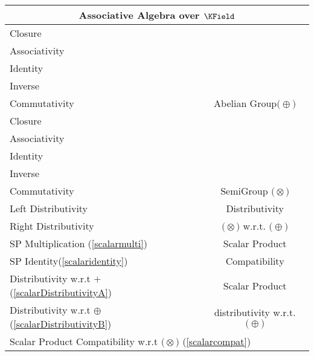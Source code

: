 \documentclass[a4paper,12pt]{scrartcl}    %
\newcommand{\OpA}{\otimes}
\newcommand{\OpB}{\oplus}
\begin{document}
\begin{minipage}[c]{0,5\textwidth}
\vspace{0.6cm}
\begin{tabular}{|l|c|} %
  \hline
  \multicolumn{2}{c}{\cellcolor{green!25}Associative Algebra over $\KField$} \\
  \hline
    \cellcolor{blue!25} \footnotesize Closure& \cellcolor{yellow!25}  \\
    \cellcolor{blue!25} \footnotesize Associativity& \cellcolor{yellow!25}  \\
    \cellcolor{blue!25} \footnotesize Identity& \cellcolor{yellow!25} \\
    \cellcolor{blue!25} \footnotesize Inverse& \cellcolor{yellow!25} \\
    \cellcolor{blue!25} \footnotesize Commutativity& \multirow{-5}{*}{\tiny\cellcolor{yellow!25}Abelian Group$\big(\OpB\big)$} \\
   \hline
    \cellcolor{blue!25} \footnotesize Closure& \cellcolor{yellow!25}  \\
    \cellcolor{blue!25} \footnotesize Associativity& \cellcolor{yellow!25}  \\
    \cellcolor{red!25} \footnotesize Identity& \cellcolor{yellow!25} \\
    \cellcolor{red!25} \footnotesize Inverse& \cellcolor{yellow!25} \\
    \cellcolor{red!25} \footnotesize Commutativity& \multirow{-5}{*}{\tiny\cellcolor{yellow!25} SemiGroup $\big(\OpA\big)$} \\
  \hline
  	\cellcolor{blue!25} \footnotesize Left Distributivity&  \tiny\cellcolor{yellow!25}Distributivity\\
    \cellcolor{blue!25} \footnotesize Right Distributivity & \tiny\cellcolor{yellow!25} $\big(\OpA\big)$ w.r.t. $\big(\OpB\big)$  \\
   \hline
  \hline
     \cellcolor{blue!25} \footnotesize SP Multiplication (\ref{scalarmulti})&  \tiny\cellcolor{yellow!25}Scalar Product\\
    \cellcolor{blue!25} \footnotesize SP Identity(\ref{scalaridentity}) & \tiny\cellcolor{yellow!25} Compatibility  \\
   \hline 
    \cellcolor{blue!25} \footnotesize Distributivity w.r.t $+$ (\ref{scalarDistributivityA})&  \tiny\cellcolor{yellow!25}Scalar Product\\
    \cellcolor{blue!25} \footnotesize Distributivity w.r.t $\OpB$ (\ref{scalarDistributivityB}) & \tiny\cellcolor{yellow!25} distributivity w.r.t. $\big(\OpB\big)$  \\
   \hline
    \multicolumn{2}{l}{\footnotesize \cellcolor{blue!25} Scalar Product Compatibility w.r.t  $\big(\OpA\big)$ (\ref{scalarcompat})}\\
   \hline
\end{tabular}

\end{minipage}
\end{document}
